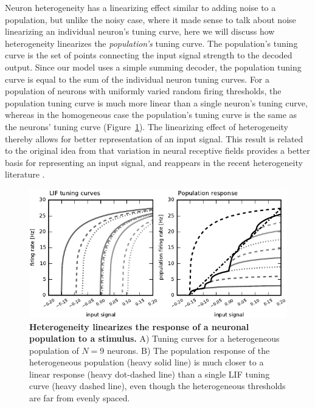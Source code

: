 \documentclass[12pt]{article}
\begin{document}
Neuron heterogeneity has a linearizing effect similar to adding noise to a population, but unlike the noisy case, where it made sense to talk about noise linearizing an individual neuron's tuning curve, here we will discuss how heterogeneity linearizes the \emph{population's} tuning curve. The population's tuning curve is the set of points connecting the input signal strength to the decoded output. Since our model uses a simple summing decoder, the population tuning curve is equal to the sum of the individual neuron tuning curves. For a population of neurons with uniformly varied random firing thresholds, the population tuning curve is much more linear than a single neuron's tuning curve, whereas in the homogeneous case the population's tuning curve is the same as the neurons' tuning curve (Figure~\ref{fig:tuninghetero}). The linearizing effect of heterogeneity thereby allows for better representation of an input signal. This result is related to the original idea from \cite{Hubel1962} that variation in neural receptive fields provides a better basis for representing an input signal, and reappears in the recent heterogeneity literature \citep{Angelo2012}.

\begin{figure}
  \ifx\hidefigures\undefined
    \centering
    \includegraphics[width=\textwidth]{figure8_tuninghetero.pdf}
  \fi
  \caption{
    \textbf{Heterogeneity linearizes the response of a neuronal population to a stimulus.} A) Tuning curves for a heterogeneous population of $N = 9$ neurons. B) The population response of the heterogeneous population (heavy solid line) is much closer to a linear response (heavy dot-dashed line) than a single LIF tuning curve (heavy dashed line), even though the heterogeneous thresholds are far from evenly spaced.
  }
  \label{fig:tuninghetero}
\end{figure}


\end{document}

